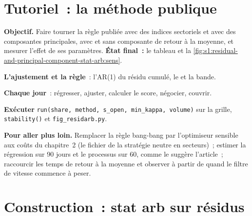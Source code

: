 \section{Tutoriel~: la méthode publique}\label{tut:s1:residual-and-principal-component-stat-arb:tut}

\begin{tutorial}
\textbf{Objectif.} Faire tourner la règle publiée avec des indices sectoriels et avec des composantes principales, avec et sans composante de retour à la moyenne, et mesurer l'effet de ses
paramètres. \textbf{État final~:} le tableau et la \cref{fig:s1:residual-and-principal-component-stat-arb:sens}.
\begin{tutsteps}
\item \textbf{L'ajustement et la règle}~: l'AR(1) du résidu cumulé, le  et la bande.
\label{lst:s1:residual-and-principal-component-stat-arb:fit}
\item \textbf{Chaque jour}~: régresser, ajuster, calculer le score, négocier, couvrir.
\label{lst:s1:residual-and-principal-component-stat-arb:loop}
\item \textbf{Exécuter} \texttt{run(share, method, s\_open, min\_kappa, volume)} sur la grille, \texttt{stability()} et \texttt{fig\_residarb.py}.
\end{tutsteps}
\textbf{Pour aller plus loin.} Remplacer la règle bang-bang par l'optimiseur sensible aux coûts du chapitre~2 (le fichier de la stratégie neutre en secteurs)~; estimer la régression
sur 90 jours et le processus sur 60, comme le suggère l'article~; raccourcir les temps de retour à la moyenne et observer à partir de quand le filtre de vitesse commence à peser.
\end{tutorial}

\section{Construction~: stat arb sur résidus}\label{bld:s1:residual-and-principal-component-stat-arb:residarb}

